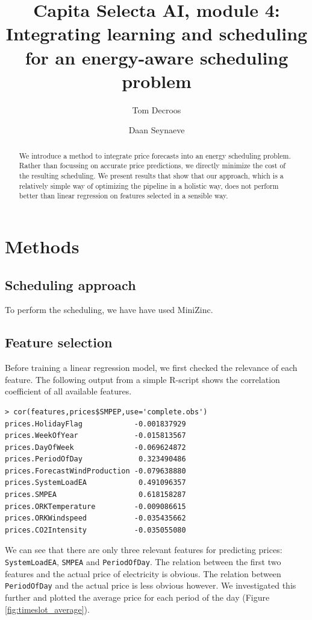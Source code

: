 \documentclass{article}
\title{Capita Selecta AI, module 4:\\ Integrating learning and scheduling for an energy-aware scheduling problem}
\author{Tom Decroos \and Daan Seynaeve}
\begin{document}
\maketitle
\begin{abstract}
	We introduce a method to integrate price forecasts into an energy scheduling problem. Rather than focussing on accurate price predictions, we directly minimize the cost of the resulting scheduling. We present results that show that our approach, which is a relatively simple way of optimizing the pipeline in a holistic way, does not perform better than linear regression on features selected in a sensible way.
\end{abstract}
\section{Methods}
\subsection{Scheduling approach}
To perform the scheduling, we have have used MiniZinc.

\subsection{Feature selection}
Before training a linear regression model, we first checked the relevance of each feature. The following output from a simple R-script shows the correlation coefficient of all available features.
\begin{verbatim}
> cor(features,prices$SMPEP,use='complete.obs')
prices.HolidayFlag            -0.001837929
prices.WeekOfYear             -0.015813567
prices.DayOfWeek              -0.069624872
prices.PeriodOfDay             0.323490486
prices.ForecastWindProduction -0.079638880
prices.SystemLoadEA            0.491096357
prices.SMPEA                   0.618158287
prices.ORKTemperature         -0.009086615
prices.ORKWindspeed           -0.035435662
prices.CO2Intensity           -0.035055080
\end{verbatim}
We can see that there are only three relevant features for predicting prices: \verb|SystemLoadEA|, \verb|SMPEA| and \verb|PeriodOfDay|. The relation between the first two features and the actual price of electricity is obvious. The relation between \verb|PeriodOfDay| and the actual price is less obvious however. We investigated this further and plotted the average price for each period of the day (Figure \ref{fig:timeslot_average}).
\end{document}
